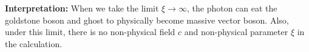 \textbf{Interpretation:} When we take the limit $\xi\to\infty$, the photon can eat the goldstone boson and ghost to physically become massive vector boson. Also, under this limit, there is no non-physical field $c$ and non-physical parameter $\xi$ in the calculation.






